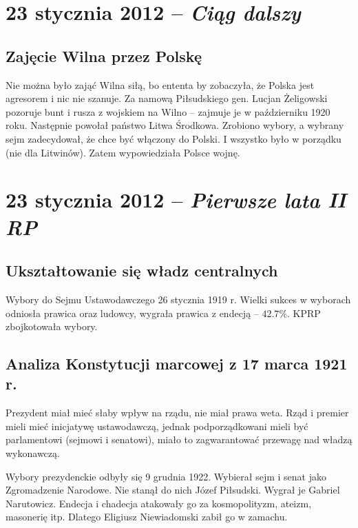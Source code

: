 \documentclass [a4paper, 11pt, oneside]{book}
\begin{document}
\chapter{23 stycznia 2012 -- \textit{Ciąg dalszy}} %
\label{cha:23_stycznia_2012_textit}
    \section{Zajęcie Wilna przez Polskę} %
    \label{sec:zaj_cie_wilna_}
        Nie można było zająć Wilna siłą, bo ententa by zobaczyła, że Polska jest agresorem i nic nie szanuje. Za namową Piłsudskiego gen. Lucjan Żeligowski pozoruje bunt i rusza z wojskiem na Wilno -- zajmuje je w październiku 1920 roku. Następnie powołał państwo Litwa Środkowa. Zrobiono wybory, a wybrany sejm zadecydował, że chce być włączony do Polski. I wszystko było w porządku (nie dla Litwinów). Zatem wypowiedziała Polsce wojnę.
\chapter{23 stycznia 2012 -- \textit{Pierwsze lata II RP}} %
\label{cha:23_stycznia_2012_textit}
    \section{Ukształtowanie się władz centralnych} %
    \label{sec:ukszta_towanie_si_w_adz_centralnych}
        Wybory do Sejmu Ustawodawczego 26 stycznia 1919 r. Wielki sukces w wyborach odniosła prawica oraz ludowcy, wygrała prawica z endecją -- $42.7\%$. KPRP zbojkotowała wybory.
    \section{Analiza Konstytucji marcowej z 17 marca 1921 r.} %
    \label{sec:analiza_konstytucji_marcowej_z_17_marca_1921_r_}
        Prezydent miał mieć słaby wpływ na rządu, nie miał prawa weta. Rząd i premier mieli mieć inicjatywę ustawodawczą, jednak podporządkowani mieli być parlamentowi (sejmowi i senatowi), miało to zagwarantować przewagę nad władzą wykonawczą.

        Wybory prezydenckie odbyły się 9 grudnia 1922. Wybierał sejm i senat jako Zgromadzenie Narodowe. Nie stanął do nich Józef Piłsudski. Wygrał je Gabriel Narutowicz. Endecja i chadecja atakowały go za kosmopolityzm, ateizm, masonerię itp. Dlatego Eligiusz Niewiadomski zabił go w zamachu.
\end{document}
